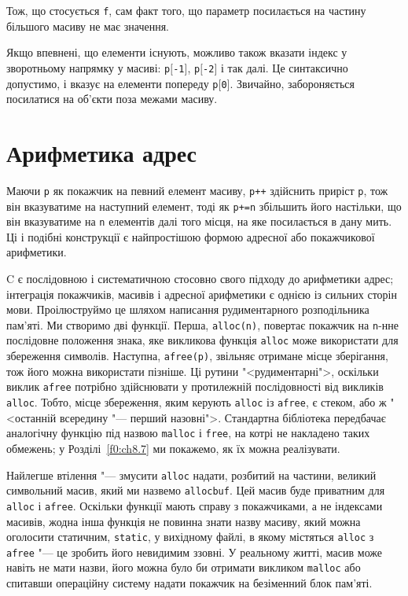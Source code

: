 \documentclass[a4paper,12pt]{book}
\begin{document}
  Тож, що стосується \texttt{f}, сам факт того, що параметр посилається на частину
  більшого масиву не має значення.

  Якщо впевнені, що елементи існують, можливо також вказати індекс у зворотньому напрямку
  у масиві: \texttt{p\mbox{$[$}-1\mbox{$]$}}, \texttt{p\mbox{$[$}-2\mbox{$]$}} і так далі.
  Це синтаксично допустимо, і вказує на елементи попереду \texttt{p\mbox{$[$}0\mbox{$]$}}.
  Звичайно, забороняється посилатися на об'єкти поза межами масиву.

\section{Арифметика адрес}


  Маючи \texttt{p} як покажчик на певний елемент масиву, \texttt{p++} здійснить приріст
  \texttt{p}, тож він вказуватиме на наступний елемент, тоді як \texttt{p+=n} збільшить
  його настільки, що він вказуватиме на \texttt{n} елементів далі того місця, на яке
  посилається в дану мить. Ці і подібні конструкції є найпростішою формою адресної
  або покажчикової арифметики.

  C є послідовною і систематичною стосовно свого підходу до арифметики адрес; інтеграція
  покажчиків, масивів і адресної арифметики є однією із сильних сторін мови. Проілюструймо
  це шляхом написання рудиментарного розподільника пам'яті. Ми створимо дві функції.
  Перша, \texttt{alloc(n)}, повертає покажчик на \texttt{n}-нне послідовне положення
  знака, яке викликова функція \texttt{alloc} може використати для збереження символів.
  Наступна, \texttt{afree(p)}, звільняє отримане місце зберігання, тож його можна
  використати пізніше. Ці рутини "<рудиментарні">, оскільки виклик
  \texttt{afree} потрібно здійснювати у протилежній послідовності від викликів
  \texttt{alloc}. Тобто, місце збереження, яким керують \texttt{alloc} із \texttt{afree},
  є стеком, або ж "<останній всередину "--- перший назовні">.
  Стандартна бібліотека передбачає аналогічну функцію під назвою \texttt{malloc} і
  \texttt{free}, на котрі не накладено таких обмежень; у Розділі~\ref{f0:ch8.7}
  ми покажемо, як їх можна реалізувати.

  Найлегше втілення "--- змусити \texttt{alloc} надати, розбитий на частини, великий
  символьний масив, який ми назвемо \texttt{allocbuf}. Цей масив буде приватним для
  \texttt{alloc} і \texttt{afree}. Оскільки функції мають справу з покажчиками, а не
  індексами масивів, жодна інша функція не повинна знати назву масиву, який можна
  оголосити статичним, \texttt{static}, у вихідному файлі, в якому містяться
  \texttt{alloc} з \texttt{afree} "--- це зробить його невидимим ззовні. У реальному
  житті, масив може навіть не мати назви, його можна було би отримати викликом
  \texttt{malloc} або спитавши операційну систему надати покажчик на безіменний блок
  пам'яті.
\end{document}
